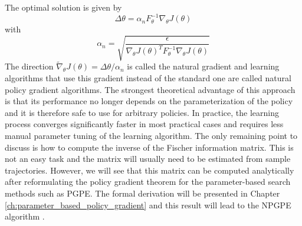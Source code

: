 The optimal solution is given by 
\begin{equation*}
	\Delta \theta = \alpha_n F_\theta^{-1} \nabla_\theta J(\theta)
\end{equation*}
with 
\begin{equation*}
	\alpha_n = \sqrt{\frac{\epsilon}{\nabla_\theta J(\theta)^T F_\theta^{-1} \nabla_\theta J(\theta)} }
\end{equation*}
The direction $\widetilde{\nabla}_\theta J(\theta) = \Delta \theta / \alpha_n$ is called the natural gradient and learning algorithms that use this gradient instead of the standard one are called natural policy gradient algorithms. The strongest theoretical advantage of this approach is that its performance no longer depends on the parameterization of the policy and it is therefore safe to use for arbitrary policies. In practice, the learning process converges significantly faster in most practical cases and requires less manual parameter tuning of the learning algorithm. The only remaining point to discuss is how to compute the inverse of the Fischer information matrix. This is not an easy task and the matrix will usually need to be estimated from sample trajectories. However, we will see that this matrix can be computed analytically after reformulating the policy gradient theorem for the parameter-based search methods such as \gls{PGPE}. The formal derivation will be presented in Chapter \ref{ch:parameter_based_policy_gradient} and this result will lead to the \gls{NPGPE} algorithm \cite{miyamae2010natural}.  
